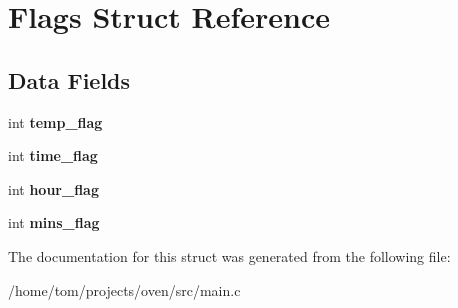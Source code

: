 \hypertarget{structFlags}{}\section{Flags Struct Reference}
\label{structFlags}
\subsection*{Data Fields}
\begin{DoxyCompactItemize}
\item 
int {\bfseries temp\+\_\+flag}\hypertarget{structFlags_af084d24fe2471769e5530c50e693b1cb}{}\label{structFlags_af084d24fe2471769e5530c50e693b1cb}

\item 
int {\bfseries time\+\_\+flag}\hypertarget{structFlags_a477839323bd269edf285d04493933d96}{}\label{structFlags_a477839323bd269edf285d04493933d96}

\item 
int {\bfseries hour\+\_\+flag}\hypertarget{structFlags_ae9c5fdc760627fe0e92dcbafbf95f65a}{}\label{structFlags_ae9c5fdc760627fe0e92dcbafbf95f65a}

\item 
int {\bfseries mins\+\_\+flag}\hypertarget{structFlags_a93f005b978588ac6cabb6219f1a712ba}{}\label{structFlags_a93f005b978588ac6cabb6219f1a712ba}

\end{DoxyCompactItemize}


The documentation for this struct was generated from the following file\+:\begin{DoxyCompactItemize}
\item 
/home/tom/projects/oven/src/main.\+c\end{DoxyCompactItemize}

